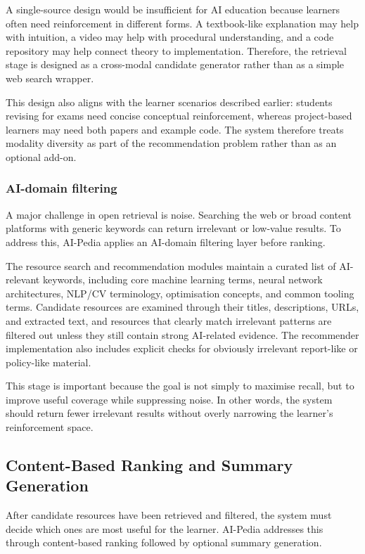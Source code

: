 \documentclass[10pt,journal,compsoc]{IEEEtran}
\begin{document}
A single-source design would be insufficient for AI education because learners often need reinforcement in different forms. A textbook-like explanation may help with intuition, a video may help with procedural understanding, and a code repository may help connect theory to implementation. Therefore, the retrieval stage is designed as a cross-modal candidate generator rather than as a simple web search wrapper.

This design also aligns with the learner scenarios described earlier: students revising for exams need concise conceptual reinforcement, whereas project-based learners may need both papers and example code. The system therefore treats modality diversity as part of the recommendation problem rather than as an optional add-on.

\subsubsection{AI-domain filtering}

A major challenge in open retrieval is noise. Searching the web or broad content platforms with generic keywords can return irrelevant or low-value results. To address this, AI-Pedia applies an AI-domain filtering layer before ranking.

The resource search and recommendation modules maintain a curated list of AI-relevant keywords, including core machine learning terms, neural network architectures, NLP/CV terminology, optimisation concepts, and common tooling terms. Candidate resources are examined through their titles, descriptions, URLs, and extracted text, and resources that clearly match irrelevant patterns are filtered out unless they still contain strong AI-related evidence. The recommender implementation also includes explicit checks for obviously irrelevant report-like or policy-like material.

This stage is important because the goal is not simply to maximise recall, but to improve useful coverage while suppressing noise. In other words, the system should return fewer irrelevant results without overly narrowing the learner's reinforcement space.

\subsection{Content-Based Ranking and Summary Generation}

After candidate resources have been retrieved and filtered, the system must decide which ones are most useful for the learner. AI-Pedia addresses this through content-based ranking followed by optional summary generation.
\end{document}
